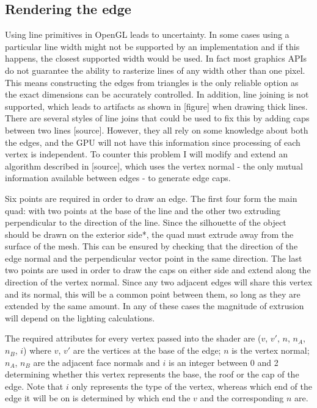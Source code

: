 \documentclass[a4paper, 12pt]{article}
\begin{document}
\subsection{Rendering the edge}

Using line primitives in OpenGL leads to uncertainty. In some cases using a particular line width might not be supported by an implementation and if this happens, the closest supported width would be used. In fact most graphics APIs do not guarantee the ability to rasterize lines of any width other than one pixel. This means constructing the edges from triangles is the only reliable option as the exact dimensions can be accurately controlled. In addition, line joining is not supported, which leads to artifacts as shown in [figure] when drawing thick lines. There are several styles of line joins that could be used to fix this by adding caps between two lines [source]. However, they all rely on some knowledge about both the edges, and the GPU will not have this information since processing of each vertex is independent. To counter this problem I will modify and extend an algorithm described in [source], which uses the vertex normal - the only mutual information available between edges - to generate edge caps.

Six points are required in order to draw an edge. The first four form the main quad: with two points at the base of the line and the other two extruding perpendicular to the direction of the line. Since the silhouette of the object should be drawn on the exterior side*, the quad must extrude away from the surface of the mesh. This can be ensured by checking that the direction of the edge normal and the perpendicular vector point in the same direction. The last two points are used in order to draw the caps on either side and extend along the direction of the vertex normal. Since any two adjacent edges will share this vertex and its normal, this will be a common point between them, so long as they are extended by the same amount. In any of these cases the magnitude of extrusion will depend on the lighting calculations.

The required attributes for every vertex passed into the shader are ($v$, $v'$, $n$, $n_A$, $n_B$, $i$) where $v$, $v'$ are the vertices at the base of the edge; $n$ is the vertex normal; $n_A$, $n_B$ are the adjacent face normals and $i$ is an integer between 0 and 2 determining whether this vertex represents the base, the roof or the cap of the edge. Note that $i$ only represents the type of the vertex, whereas which end of the edge it will be on is determined by which end the $v$ and the corresponding $n$ are.
\end{document}
